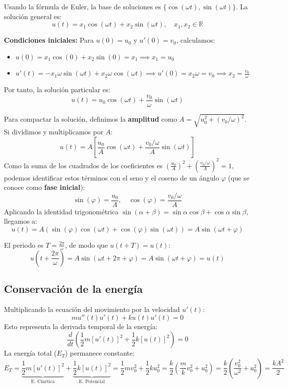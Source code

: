 Usando la fórmula de Euler, la base de soluciones es $\{\cos(\omega t), \sin(\omega t)\}$. La solución general es:
\[
    u(t) = x_1 \cos(\omega t) + x_2 \sin(\omega t), \quad x_1, x_2 \in \mathbb{R}
\]

\textbf{Condiciones iniciales:} Para $u(0) = u_0$ y $u'(0) = v_0$, calculamos:
\begin{itemize}
    \item $u(0) = x_1 \cos(0) + x_2 \sin(0) = x_1 \implies x_1 = u_0$
    \item $u'(t) = -x_1 \omega \sin(\omega t) + x_2 \omega \cos(\omega t) \implies u'(0) = x_2 \omega = v_0 \implies x_2 = \frac{v_0}{\omega}$
\end{itemize}

Por tanto, la solución particular es:
\[
    u(t) = u_0 \cos(\omega t) + \frac{v_0}{\omega} \sin(\omega t)
\]

Para compactar la solución, definimos la \textbf{amplitud} como $A = \sqrt{u_0^2 + (v_0/\omega)^2}$. Si dividimos y multiplicamos por $A$:
\[
    u(t) = A \left[ \frac{u_0}{A} \cos(\omega t) + \frac{v_0/\omega}{A} \sin(\omega t) \right]
\]
Como la suma de los cuadrados de los coeficientes es $\left(\frac{u_0}{A}\right)^2 + \left(\frac{v_0/\omega}{A}\right)^2 = 1$, podemos identificar estos términos con el seno y el coseno de un ángulo $\varphi$ (que se conoce como \textbf{fase inicial}):
\[
    \sin(\varphi) = \frac{u_0}{A}, \quad \cos(\varphi) = \frac{v_0/\omega}{A}
\]
Aplicando la identidad trigonométrica $\sin(\alpha + \beta) = \sin\alpha\cos\beta + \cos\alpha\sin\beta$, llegamos a:
\[
    u(t) = A (\sin(\varphi)\cos(\omega t) + \cos(\varphi)\sin(\omega t)) = A \sin(\omega t + \varphi)
\]

El periodo es $T = \frac{2\pi}{\omega}$, de modo que $u(t + T) = u(t)$:
\[
    u(t + \frac{2\pi}{\omega}) = A \sin(\omega t + 2\pi + \varphi) = A \sin(\omega t + \varphi) = u(t)
\]

\subsection{Conservación de la energía}

Multiplicando la ecuación del movimiento por la velocidad $u'(t)$:
\[
    m u''(t) u'(t) + k u(t) u'(t) = 0
\]
Esto representa la derivada temporal de la energía:
\[
    \frac{d}{dt} \left( \frac{1}{2} m [u'(t)]^2 + \frac{1}{2} k [u(t)]^2 \right) = 0
\]
La energía total ($E_T$) permanece constante:
\[
    E_T = \underbrace{\frac{1}{2} m [u'(t)]^2}_{\text{E. Cinética}} + \underbrace{\frac{1}{2} k [u(t)]^2}_{\text{E. Potencial}} = \frac{1}{2} m v_0^2 + \frac{1}{2} k u_0^2 = \frac{k}{2} \left( \frac{m}{k} v_0^2 + u_0^2 \right) = \frac{k}{2} \left( \frac{v_0^2}{\omega^2} + u_0^2 \right) = \frac{k A^2}{2}
\]

